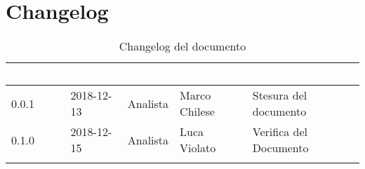 \newpage

\section{Changelog}

\begin{center}
\begin{longtable}[c]{|m{}|m{}|m{}|m{}|p{}|}
\hline
\rowcolor{bluelogo}\textbf{\textcolor{white}{Versione}} & \textbf{\textcolor{white}{Data}} & \textbf{\textcolor{white}{Ruolo}} & \textbf{\textcolor{white}{Autore}} & \textbf{\textcolor{white}{Descrizione}}\\
\hline \hline
\endfirsthead
0.0.1 & 2018-12-13 & Analista &Marco Chilese  & Stesura del documento \\
\hline
\rowcolor{grigio} 0.1.0 & 2018-12-15 & Analista & Luca Violato &  Verifica del Documento \\
\hline
\caption{Changelog del documento}
\end{longtable}
\end{center}
